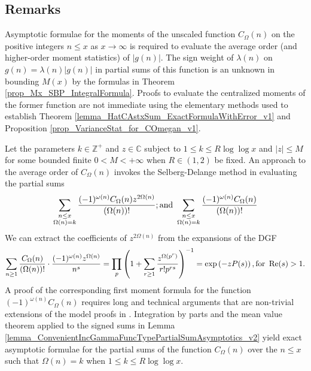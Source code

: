 \documentclass[11pt,reqno,a4letter]{article}
\newcommand{\hlocalref}[1]{\hyperref[#1]{\ref{#1}}}
\numberwithin{equation}{section}
\numberwithin{figure}{section}
\numberwithin{table}{section}
\theoremstyle{plain}
\numberwithin{theorem}{section}
\theoremstyle{definition}
\theoremstyle{remark}
\renewcommand{\Re}{\operatorname{Re}}
\newcommand{\mathtext}[1]{\text{\rm #1}}
\begin{document}
\subsection{Remarks} 
\label{subSection_RemarksOnAvgOrderFor_COmegan_directly_SelbergDelangeMethod} 

Asymptotic formulae for the moments of the unscaled function $C_{\Omega}(n)$ on the 
positive integers $n \leq x$ as $x \rightarrow \infty$ is required 
to evaluate the average order (and higher-order moment statistics) of $|g(n)|$. 
The sign weight of $\lambda(n)$ on $g(n) = \lambda(n) |g(n)|$ in partial sums of this 
function is an unknown in bounding $M(x)$ by the formulas in 
Theorem \hlocalref{prop_Mx_SBP_IntegralFormula}. 
Proofs to evaluate the centralized moments of the former function are not 
immediate using the elementary methods used to establish 
Theorem \hlocalref{lemma_HatCAstxSum_ExactFormulaWithError_v1} and 
Proposition \hlocalref{prop_VarianceStat_for_COmegan_v1}.

Let the parameters $k \in \mathbb{Z}^{+}$ and $z \in \mathbb{C}$ subject to 
$1 \leq k \leq R \log\log x$ and $|z| \leq M$ for some bounded finite 
$0 < M < +\infty$ when $R \in (1, 2)$ be fixed. 
An approach to the average order of $C_{\Omega}(n)$ 
invokes the Selberg-Delange method 
\cite[\S II.6.1]{TENENBAUM-PROBNUMT-METHODS} \cite[\S 7.4]{MV} 
in evaluating the partial sums 
\[
\sum_{\substack{n \leq x \\ \Omega(n)=k}} \frac{(-1)^{\omega(n)} 
     C_{\Omega}(n) z^{2\Omega(n)}}{(\Omega(n))!}; \mathtext{ and } 
     \sum_{\substack{n \leq x \\ \Omega(n)=k}} \frac{(-1)^{\omega(n)} 
     C_{\Omega}(n)}{(\Omega(n))!} 
\]
We can extract the coefficients of $z^{2\Omega(n)}$ 
from the expansions of the DGF 
\[
\sum_{n \geq 1} \frac{C_{\Omega}(n)}{(\Omega(n))!} \cdot 
     \frac{(-1)^{\omega(n)} z^{\Omega(n)}}{n^s} = \prod_p \left(1 + \sum_{r \geq 1} 
     \frac{z^{\Omega(p^r)}}{r! p^{rs}}\right)^{-1} 
     = \exp\left(-z P(s)\right), \mathtext{ for } \Re(s) > 1. 
\]
A proof of the corresponding first moment formula for the 
function $(-1)^{\omega(n)} C_{\Omega}(n)$ requires long and technical arguments 
that are non-trivial extensions of the model proofs in 
\cite{MV,TENENBAUM-PROBNUMT-METHODS}. 
Integration by parts and the mean value theorem applied to the 
signed sums in Lemma \hlocalref{lemma_ConvenientIncGammaFuncTypePartialSumAsymptotics_v2} 
yield exact asymptotic formulae for the partial sums of 
the function $C_{\Omega}(n)$ over the $n \leq x$ such that $\Omega(n) = k$ 
when $1 \leq k \leq R \log\log x$. 
\end{document}
